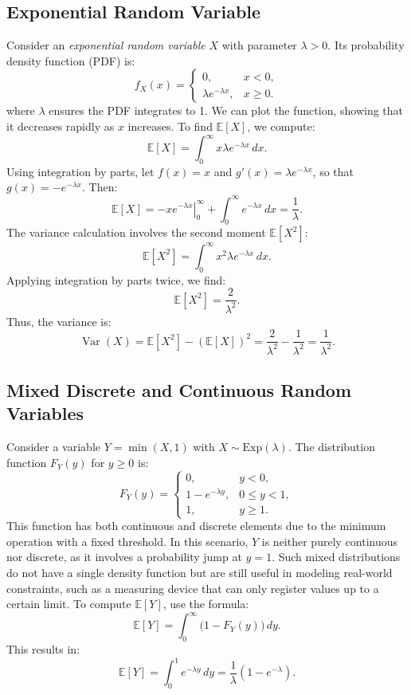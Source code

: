     \subsection{Exponential Random Variable}
    Consider an \emph{exponential random variable} \(X\) with parameter \(\lambda > 0\). Its probability density function (PDF) is:
    \[
    f_X(x) = 
    \begin{cases} 
    0, & x < 0, \\
    \lambda e^{-\lambda x}, & x \geq 0.
    \end{cases}
    \]
    where \(\lambda\) ensures the PDF integrates to 1. We can plot the function, showing that it decreases rapidly as \(x\) increases. \newline
    To find \(\mathbb{E}[X]\), we compute:
    \[
    \mathbb{E}[X] = \int_0^{\infty} x \lambda e^{-\lambda x} \, dx.
    \]
    Using integration by parts, let \(f(x) = x\) and \(g'(x) = \lambda e^{-\lambda x}\), so that \(g(x) = -e^{-\lambda x}\). Then:
    \[
    \mathbb{E}[X] = \left. -x e^{-\lambda x} \right|_0^{\infty} + \int_0^{\infty} e^{-\lambda x} \, dx = \frac{1}{\lambda}.
    \]
    The variance calculation involves the second moment \(\mathbb{E}[X^2]\):
    \[
    \mathbb{E}[X^2] = \int_0^{\infty} x^2 \lambda e^{-\lambda x} \, dx.
    \]
    Applying integration by parts twice, we find:
    \[
    \mathbb{E}[X^2] = \frac{2}{\lambda^2}.
    \]
    Thus, the variance is:
    \[
    \operatorname{Var}(X) = \mathbb{E}[X^2] - (\mathbb{E}[X])^2 = \frac{2}{\lambda^2} - \frac{1}{\lambda^2} = \frac{1}{\lambda^2}.
    \]
    
    \subsection{Mixed Discrete and Continuous Random Variables}
    Consider a variable \(Y = \min(X, 1)\) with \(X \sim \text{Exp}(\lambda)\). The distribution function \(F_Y(y)\) for \(y \geq 0\) is:
    \[
    F_Y(y) = 
    \begin{cases} 
    0, & y < 0, \\
    1 - e^{-\lambda y}, & 0 \leq y < 1, \\
    1, & y \geq 1.
    \end{cases}
    \]
    This function has both continuous and discrete elements due to the minimum operation with a fixed threshold. In this scenario, \(Y\) is neither purely continuous nor discrete, as it involves a probability jump at \(y = 1\). Such mixed distributions do not have a single density function but are still useful in modeling real-world constraints, such as a measuring device that can only register values up to a certain limit. \newline
    To compute \( \mathbb{E}[Y] \), use the formula:
    \[
    \mathbb{E}[Y] = \int_0^{\infty} \big(1 - F_Y(y)\big) \, dy.
    \]
    This results in:
    \[
    \mathbb{E}[Y] = \int_0^1 e^{-\lambda y} \, dy = \frac{1}{\lambda} \left(1 - e^{-\lambda}\right).
    \]
    
    